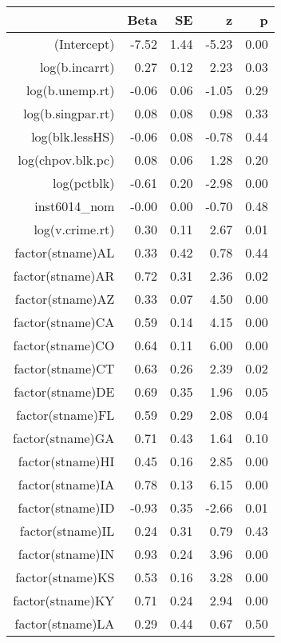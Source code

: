 \begin{table}[ht]
\centering
\begin{tabular}{rrrrr}
  \hline
 & Beta & SE & z & p \\ 
  \hline
(Intercept) & -7.52 & 1.44 & -5.23 & 0.00 \\ 
  log(b.incarrt) & 0.27 & 0.12 & 2.23 & 0.03 \\ 
  log(b.unemp.rt) & -0.06 & 0.06 & -1.05 & 0.29 \\ 
  log(b.singpar.rt) & 0.08 & 0.08 & 0.98 & 0.33 \\ 
  log(blk.lessHS) & -0.06 & 0.08 & -0.78 & 0.44 \\ 
  log(chpov.blk.pc) & 0.08 & 0.06 & 1.28 & 0.20 \\ 
  log(pctblk) & -0.61 & 0.20 & -2.98 & 0.00 \\ 
  inst6014\_nom & -0.00 & 0.00 & -0.70 & 0.48 \\ 
  log(v.crime.rt) & 0.30 & 0.11 & 2.67 & 0.01 \\ 
  factor(stname)AL & 0.33 & 0.42 & 0.78 & 0.44 \\ 
  factor(stname)AR & 0.72 & 0.31 & 2.36 & 0.02 \\ 
  factor(stname)AZ & 0.33 & 0.07 & 4.50 & 0.00 \\ 
  factor(stname)CA & 0.59 & 0.14 & 4.15 & 0.00 \\ 
  factor(stname)CO & 0.64 & 0.11 & 6.00 & 0.00 \\ 
  factor(stname)CT & 0.63 & 0.26 & 2.39 & 0.02 \\ 
  factor(stname)DE & 0.69 & 0.35 & 1.96 & 0.05 \\ 
  factor(stname)FL & 0.59 & 0.29 & 2.08 & 0.04 \\ 
  factor(stname)GA & 0.71 & 0.43 & 1.64 & 0.10 \\ 
  factor(stname)HI & 0.45 & 0.16 & 2.85 & 0.00 \\ 
  factor(stname)IA & 0.78 & 0.13 & 6.15 & 0.00 \\ 
  factor(stname)ID & -0.93 & 0.35 & -2.66 & 0.01 \\ 
  factor(stname)IL & 0.24 & 0.31 & 0.79 & 0.43 \\ 
  factor(stname)IN & 0.93 & 0.24 & 3.96 & 0.00 \\ 
  factor(stname)KS & 0.53 & 0.16 & 3.28 & 0.00 \\ 
  factor(stname)KY & 0.71 & 0.24 & 2.94 & 0.00 \\ 
  factor(stname)LA & 0.29 & 0.44 & 0.67 & 0.50 \\ 

\end{tabular}
\end{table}
